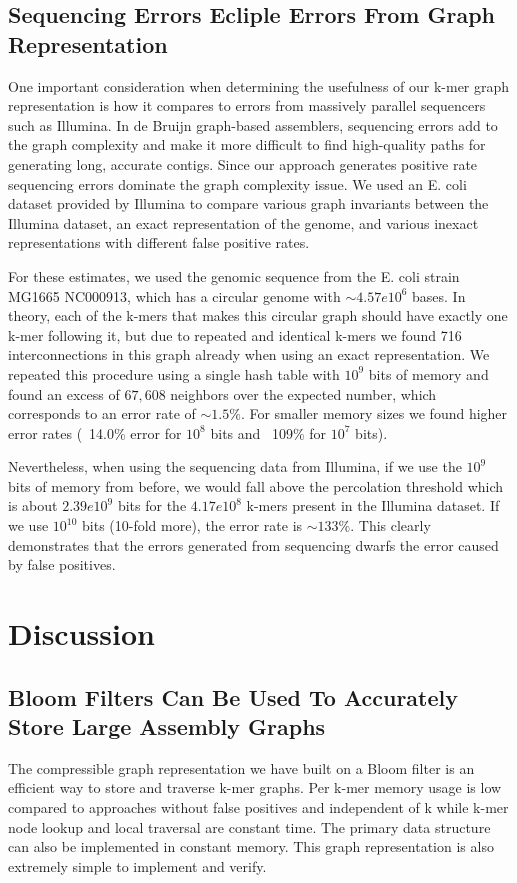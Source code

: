 \documentclass[12pt]{article} \usepackage{simplemargins}
\begin{document}
\subsection{Sequencing Errors Ecliple Errors From Graph Representation}
One important consideration when determining the usefulness of our k-mer
graph representation is how it compares to errors from massively
parallel sequencers such as Illumina. In de Bruijn graph-based
assemblers, sequencing errors add to the graph complexity and make it
more difficult to find high-quality paths for generating long,
accurate contigs. Since our approach generates
positive rate sequencing errors dominate the graph complexity
issue. We used an E. coli dataset provided by Illumina to compare
various graph invariants between the Illumina dataset, an exact
representation of the genome, and various inexact representations with
different false positive rates.

For these estimates, we used the genomic sequence from the E. coli strain 
MG1665 NC000913, which has a circular genome with $\sim 4.57e10^6$ bases. 
In theory, each of the k-mers that makes this
circular graph should have exactly one k-mer following it, but due to 
repeated and identical k-mers we found 716 interconnections in this graph 
already when using an exact representation. We repeated this procedure 
using a single hash table with $10^9$ bits of memory and found an excess of 
$67,608$ neighbors over the expected number, which corresponds to an error rate of 
$\sim 1.5\%$. For smaller memory 
sizes we found higher error rates (~14.0\% error for $10^8$ bits and 
~109\% for $10^7$ bits).

Nevertheless, when using 
the sequencing data from Illumina, if we use the $10^9$ bits of memory 
from before, we would fall above the percolation threshold which is 
about $2.39e10^9$ bits for the 
$4.17e10^8$ k-mers present in the Illumina dataset. 
If we use $10^{10}$ bits (10-fold more), the error rate is 
$\sim 133\%$. This clearly demonstrates that
the errors generated from sequencing dwarfs the error caused by false positives.

\section{Discussion}

\subsection{Bloom Filters Can Be Used To Accurately Store Large Assembly Graphs}
The compressible graph representation we have built on a Bloom filter
is an efficient way to store and traverse k-mer graphs.  Per k-mer
memory usage is low compared to approaches without false positives
and independent of k while k-mer node lookup and
local traversal are constant time.  The primary data structure can
also be implemented in constant memory.  This graph representation is
also extremely simple to implement and verify.
\end{document}
